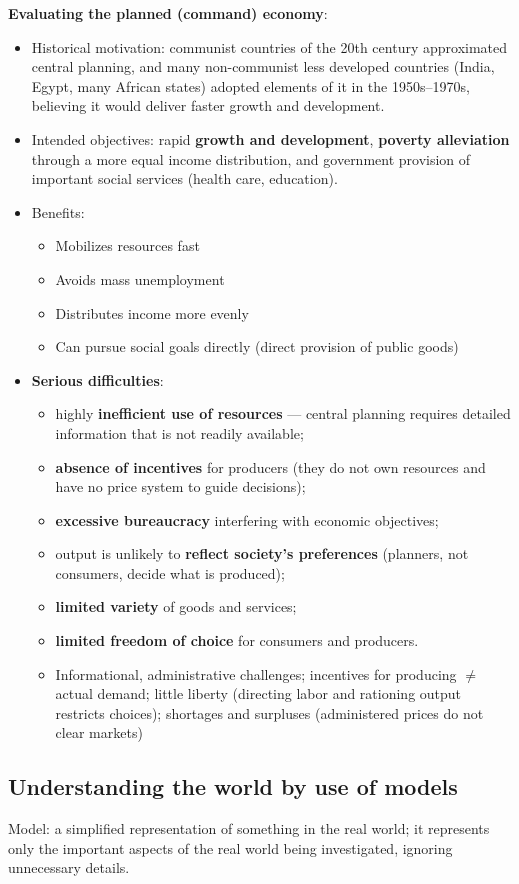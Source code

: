 \textbf{Evaluating the planned (command) economy}:
\begin{itemize}
  \item Historical motivation: communist countries of the 20th century approximated central planning, and many non-communist less developed countries (India, Egypt, many African states) adopted elements of it in the 1950s--1970s, believing it would deliver faster growth and development.
  \item Intended objectives: rapid \textbf{growth and development}, \textbf{poverty alleviation} through a more equal income distribution, and government provision of important social services (health care, education).
  \item Benefits:
  \begin{itemize}
  	\item Mobilizes resources fast
	\item Avoids mass unemployment
	\item Distributes income more evenly
	\item Can pursue social goals directly (direct provision of public goods)
  \end{itemize}
  \item \textbf{Serious difficulties}:
  \begin{itemize}
    \item highly \textbf{inefficient use of resources} --- central planning requires detailed information that is not readily available;
    \item \textbf{absence of incentives} for producers (they do not own resources and have no price system to guide decisions);
    \item \textbf{excessive bureaucracy} interfering with economic objectives;
    \item output is unlikely to \textbf{reflect society's preferences} (planners, not consumers, decide what is produced);
    \item \textbf{limited variety} of goods and services;
    \item \textbf{limited freedom of choice} for consumers and producers.
    \item Informational, administrative challenges; incentives for producing $\neq$ actual demand; little liberty (directing labor and rationing output restricts choices); shortages and surpluses (administered prices do not clear markets)
  \end{itemize}
\end{itemize}
\subsection{Understanding the world by use of models}
Model: a simplified representation of something in the real world; it represents only the important aspects of the real world being investigated, ignoring unnecessary details.
